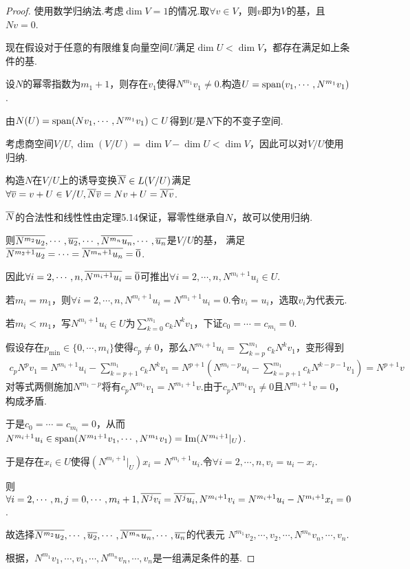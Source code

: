 \begin{proof}
    使用数学归纳法.考虑\(\dim V=1\)的情况.取\(\forall v \in V\)，则\(v\)即为\(V\)的基，且\(Nv=0\).

    现在假设对于任意的有限维复向量空间\(U\)满足\(\dim U<\dim V\)，都存在满足如上条件的基.
    
    设\(N\)的幂零指数为\(m_1+1\)，则存在\(v_1\)使得\(N^{m_1}v_1 \ne 0\).构造\(U=\operatorname{span}(v_1,\cdots,N^{m_1}v_1)\).
    
    由\(N(U)=\operatorname{span}(Nv_1,\cdots,N^{m_1}v_1) \subset U\)得到\(U\)是\(N\)下的不变子空间.
    
    考虑商空间\(V/U,\dim (V/U)=\dim V-\dim U<\dim V\)，因此可以对\(V/U\)使用归纳.
    
    构造\(N\)在\(V/U\)上的诱导变换\(\overline{N} \in L(V/U)\)满足\(\forall \overline{v}=v+U \in V/U,\overline{N}\overline{v}=Nv+U=\overline{Nv}\).
    
    \(\overline{N}\)的合法性和线性性由定理5.14保证，幂零性继承自\(N\)，故可以使用归纳.
    
    则\(\overline{N^{m_2}u_2},\cdots,\overline{u_2},\cdots,\overline{N^{m_n}u_n},\cdots,\overline{u_n}\)是\(V/U\)的基，
    满足\(\overline{N^{m_2+1}u_2}=\cdots=\overline{N^{m_n+1}u_n}=\overline{0}\).
    
    因此\(\forall i=2,\cdots,n,\overline{N^{m_i+1}u_i}=\overline{0}\)可推出\(\forall i=2,\cdots,n,N^{m_i+1}u_i \in U\).
    
    若\(m_i=m_1\)，则\(\forall i=2,\cdots,n,N^{m_i+1}u_i=N^{m_1+1}u_i=0\).令\(v_i=u_i\)，选取\(v_i\)为代表元.
    
    若\(m_i<m_1\)，写\(N^{m_i+1}u_i \in U\)为\(\sum_{k=0}^{m_1}c_kN^kv_1\)，下证\(c_0=\cdots=c_{m_i}=0\).
    
    假设存在\(p_{\min} \in \{0,\cdots,m_i\}\)使得\(c_p \ne 0\)，那么\(N^{m_i+1}u_i=\sum_{k=p}^{m_1}c_kN^kv_1\)，变形得到
    \begin{align*}
        c_pN^pv_1=N^{m_i+1}u_i-\sum_{k=p+1}^{m_1}c_kN^kv_1=N^{p+1}(N^{m_i-p}u_i-\sum_{k=p+1}^{m_1}c_kN^{k-p-1}v_1)=N^{p+1}v
    \end{align*}
    对等式两侧施加\(N^{m_1-p}\)将有\(c_pN^{m_1}v_1=N^{m_1+1}v\).由于\(c_pN^{m_1}v_1 \ne 0\)且\(N^{m_1+1}v=0\)，构成矛盾.

    于是\(c_0=\cdots=c_{m_i}=0\)，从而\(N^{m_i+1}u_i \in \operatorname{span}(N^{m_1+1}v_1,\cdots,N^{m_1}v_1)=\operatorname{Im}(N^{m_i+1}|_U)\).
    
    于是存在\(x_i \in U\)使得\((N^{m_i+1}|_U)x_i=N^{m_i+1}u_i\).令\(\forall i=2,\cdots,n,v_i=u_i-x_i\).
    
    则\(\forall i=2,\cdots,n,j=0,\cdots,m_i+1,\overline{N^jv_i}=\overline{N^ju_i},N^{m_i+1}v_i=N^{m_i+1}u_i-N^{m_i+1}x_i=0\).

    故选择\(\overline{N^{m_2}u_2},\cdots,\overline{u_2},\cdots,\overline{N^{m_n}u_n},\cdots,\overline{u_n}\)的代表元
    \(N^{m_1}v_2,\cdots,v_2,\cdots,N^{m_n}v_n,\cdots,v_n\).
    
    根据，\(N^{m_1}v_1,\cdots,v_1,\cdots,N^{m_n}v_n,\cdots,v_n\)是一组满足条件的基.
\end{proof}

